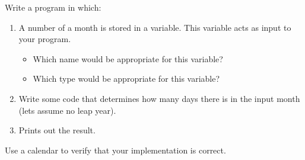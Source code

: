 Write a program in which:

\begin{enumerate}
  \item A number of a month is stored in a variable. This variable acts as input to your program.
    \begin{itemize}
      \item Which name would be appropriate for this variable?
      \item Which type would be appropriate for this variable?
    \end{itemize}
  \item Write some code that determines how many days there is in the input month (lets assume no leap year).
  \item Prints out the result.
\end{enumerate}

Use a calendar to verify that your implementation is correct.
